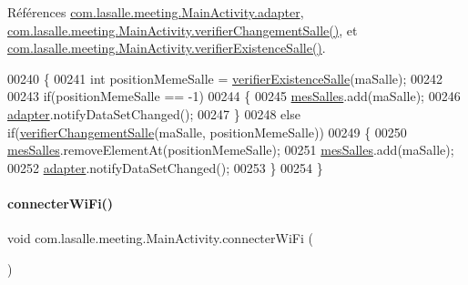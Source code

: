 Références \hyperlink{_main_activity_8java_source_l00055}{com.\+lasalle.\+meeting.\+Main\+Activity.\+adapter}, \hyperlink{_main_activity_8java_source_l00291}{com.\+lasalle.\+meeting.\+Main\+Activity.\+verifier\+Changement\+Salle()}, et \hyperlink{_main_activity_8java_source_l00261}{com.\+lasalle.\+meeting.\+Main\+Activity.\+verifier\+Existence\+Salle()}.


\begin{DoxyCode}
00240     \{
00241         \textcolor{keywordtype}{int} positionMemeSalle = \hyperlink{classcom_1_1lasalle_1_1meeting_1_1_main_activity_ad0924169264a808e34a20c406efe0db2}{verifierExistenceSalle}(maSalle);
00242 
00243         \textcolor{keywordflow}{if}(positionMemeSalle == -1)
00244         \{
00245             \hyperlink{classcom_1_1lasalle_1_1meeting_1_1_main_activity_ab13e34516d877abc3ba937505b441979}{mesSalles}.add(maSalle);
00246             \hyperlink{classcom_1_1lasalle_1_1meeting_1_1_main_activity_ac0af1346d6f4b3b4bd549b324c0523cc}{adapter}.notifyDataSetChanged();
00247         \}
00248         \textcolor{keywordflow}{else} \textcolor{keywordflow}{if}(\hyperlink{classcom_1_1lasalle_1_1meeting_1_1_main_activity_a1502e68ede2683ced61843887ca63963}{verifierChangementSalle}(maSalle, positionMemeSalle))
00249         \{
00250             \hyperlink{classcom_1_1lasalle_1_1meeting_1_1_main_activity_ab13e34516d877abc3ba937505b441979}{mesSalles}.removeElementAt(positionMemeSalle);
00251             \hyperlink{classcom_1_1lasalle_1_1meeting_1_1_main_activity_ab13e34516d877abc3ba937505b441979}{mesSalles}.add(maSalle);
00252             \hyperlink{classcom_1_1lasalle_1_1meeting_1_1_main_activity_ac0af1346d6f4b3b4bd549b324c0523cc}{adapter}.notifyDataSetChanged();
00253         \}
00254     \}
\end{DoxyCode}
\mbox{\label{classcom_1_1lasalle_1_1meeting_1_1_main_activity_a8a28bbbc80b8806750b6297222f0bc92}} 
\paragraph{\texorpdfstring{connecter\+Wi\+Fi()}{connecterWiFi()}}
{\footnotesize\ttfamily void com.\+lasalle.\+meeting.\+Main\+Activity.\+connecter\+Wi\+Fi (\begin{DoxyParamCaption}{ }\end{DoxyParamCaption})\hspace{0.3cm}{\ttfamily [private]}}



